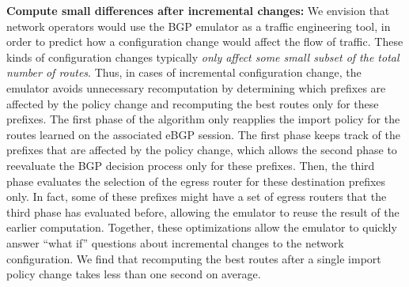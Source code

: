 \textbf{Compute small differences after incremental changes:}
We envision that network operators would use the BGP emulator as a
traffic engineering tool, in order to predict how a configuration
change would affect the flow of traffic.  These kinds of configuration
changes typically {\em only affect some small subset of the total
number of routes}.  Thus, in cases of incremental configuration
change, the emulator avoids unnecessary recomputation by determining
which prefixes are affected by the policy change and recomputing the
best routes only for these prefixes.
The first phase of the algorithm only reapplies the import policy for
the routes learned on the associated eBGP session.  The first phase
keeps track of the prefixes that are affected by the policy change,
which allows the second phase to reevaluate the BGP decision process
only for these prefixes.  Then, the third phase evaluates the
selection of the egress router for these destination prefixes only.  In
fact, some of these prefixes might have a set of egress routers that
the third phase has evaluated before, allowing the emulator to reuse
the result of the earlier computation.  Together, these optimizations
allow the emulator to quickly answer ``what if'' questions
about incremental changes to the network configuration.  We find that
recomputing the best routes after a single import policy change takes
less than one second on average.



